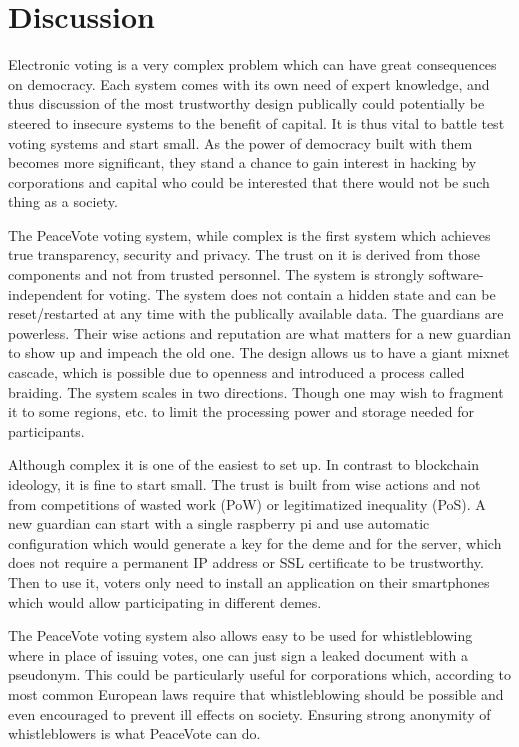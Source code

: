 \documentclass[12pt,a4paper]{article}
\let\Oldsection\section
\renewcommand{\section}{\FloatBarrier\Oldsection}
\begin{document}
\section{Discussion}
Electronic voting is a very complex problem which can have great consequences on democracy. Each system comes with its own need of expert knowledge, and thus discussion of the most trustworthy design publically could potentially be steered to insecure systems to the benefit of capital. It is thus vital to battle test voting systems and start small. As the power of democracy built with them becomes more significant, they stand a chance to gain interest in hacking by corporations and capital who could be interested that there would not be such thing as a society.\par
The PeaceVote voting system, while complex is the first system which achieves true transparency, security and privacy. The trust on it is derived from those components and not from trusted personnel. The system is strongly software-independent for voting. The system does not contain a hidden state and can be reset/restarted at any time with the publically available data. The guardians are powerless. Their wise actions and reputation are what matters for a new guardian to show up and impeach the old one. The design allows us to have a giant mixnet cascade, which is possible due to openness and introduced a process called braiding. The system scales in two directions. Though one may wish to fragment it to some regions, etc. to limit the processing power and storage needed for participants.\par
Although complex it is one of the easiest to set up. In contrast to blockchain ideology, it is fine to start small. The trust is built from wise actions and not from competitions of wasted work (PoW) or legitimatized inequality (PoS). A new guardian can start with a single raspberry pi and use automatic configuration which would generate a key for the deme and for the server, which does not require a permanent IP address or SSL certificate to be trustworthy. Then to use it, voters only need to install an application on their smartphones which would allow participating in different demes.\par
The PeaceVote voting system also allows easy to be used for whistleblowing where in place of issuing votes, one can just sign a leaked document with a pseudonym. This could be particularly useful for corporations which, according to most common European laws require that whistleblowing should be possible and even encouraged to prevent ill effects on society. Ensuring strong anonymity of whistleblowers is what PeaceVote can do.\par
\end{document}
